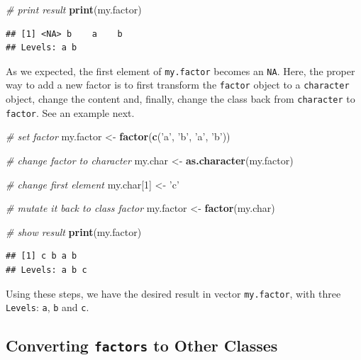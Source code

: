 \documentclass[11pt,]{book}
\newenvironment{Shaded}{\begin{snugshade}}{\end{snugshade}}
\newcommand{\KeywordTok}[1]{\textcolor[rgb]{0.27,0.27,0.27}{\textbf{#1}}}
\newcommand{\DecValTok}[1]{\textcolor[rgb]{0.06,0.06,0.06}{#1}}
\newcommand{\StringTok}[1]{\textcolor[rgb]{0.5,0.5,0.5}{#1}}
\newcommand{\CommentTok}[1]{\textcolor[rgb]{0.56,0.35,0.01}{\textit{#1}}}
\newcommand{\NormalTok}[1]{#1}
\begin{document}
\begin{Shaded}
\begin{Highlighting}[]
\CommentTok{# print result}
\KeywordTok{print}\NormalTok{(my.factor)}
\end{Highlighting}
\end{Shaded}

\begin{verbatim}
## [1] <NA> b    a    b   
## Levels: a b
\end{verbatim}

As we expected, the first element of \texttt{my.factor} becomes an
\texttt{NA}. Here, the proper way to add a new factor is to first
transform the \texttt{factor} object to a \texttt{character} object,
change the content and, finally, change the class back from
\texttt{character} to \texttt{factor}. See an example next.

\begin{Shaded}
\begin{Highlighting}[]
\CommentTok{# set factor}
\NormalTok{my.factor <-}\StringTok{ }\KeywordTok{factor}\NormalTok{(}\KeywordTok{c}\NormalTok{(}\StringTok{'a'}\NormalTok{, }\StringTok{'b'}\NormalTok{, }\StringTok{'a'}\NormalTok{, }\StringTok{'b'}\NormalTok{))}

\CommentTok{# change factor to character}
\NormalTok{my.char <-}\StringTok{ }\KeywordTok{as.character}\NormalTok{(my.factor)}

\CommentTok{# change first element}
\NormalTok{my.char[}\DecValTok{1}\NormalTok{] <-}\StringTok{ 'c'}

\CommentTok{# mutate it back to class factor}
\NormalTok{my.factor <-}\StringTok{ }\KeywordTok{factor}\NormalTok{(my.char)}

\CommentTok{# show result}
\KeywordTok{print}\NormalTok{(my.factor)}
\end{Highlighting}
\end{Shaded}

\begin{verbatim}
## [1] c b a b
## Levels: a b c
\end{verbatim}

Using these steps, we have the desired result in vector
\texttt{my.factor}, with three \texttt{Levels}: \texttt{a}, \texttt{b}
and \texttt{c}.

\subsection{\texorpdfstring{Converting \texttt{factors} to Other
Classes}{Converting factors to Other Classes}}\label{converting-factors-to-other-classes}
\end{document}
